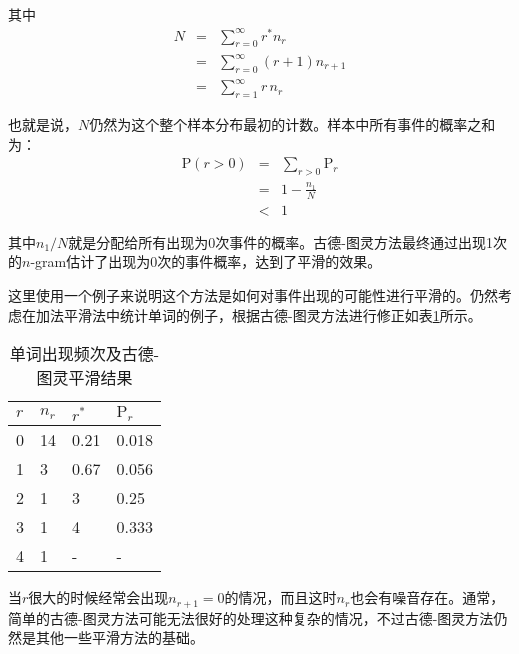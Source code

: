 \noindent 其中
\begin{eqnarray}
N & = & \sum_{r=0}^{\infty}{r^{*}n_r} \nonumber \\
  & = & \sum_{r=0}^{\infty}{(r + 1)n_{r + 1}} \nonumber \\
  & = & \sum_{r=1}^{\infty}{r\,n_r}
\label{eq:2-31}
\end{eqnarray}

也就是说，$N$仍然为这个整个样本分布最初的计数。样本中所有事件的概率之和为：
\begin{eqnarray}
\textrm{P}(r>0) & = & \sum_{r>0}{\textrm{P}_r} \nonumber \\
                & = & 1 - \frac{n_1}{N} \nonumber \\
                & < & 1
\label{eq:2-32}
\end{eqnarray}

\noindent 其中$n_1/N$就是分配给所有出现为0次事件的概率。古德-图灵方法最终通过出现1次的$n$-gram估计了出现为0次的事件概率，达到了平滑的效果。

\parinterval 这里使用一个例子来说明这个方法是如何对事件出现的可能性进行平滑的。仍然考虑在加法平滑法中统计单词的例子，根据古德-图灵方法进行修正如表\ref{tab:2-21}所示。

\begin{table}[htp]{
\begin{center}
\caption{单词出现频次及古德-图灵平滑结果}
{
\begin{tabular}{l|lll}
\rule{0pt}{10pt} $r$ & $n_r$ & $r^*$ & $\textrm{P}_r$\\ \hline
\rule{0pt}{10pt} 0 & 14 & 0.21 & 0.018 \\
\rule{0pt}{10pt} 1 & 3 & 0.67 & 0.056 \\
\rule{0pt}{10pt} 2 & 1 & 3 & 0.25 \\
\rule{0pt}{10pt} 3 & 1 & 4 & 0.333 \\
\rule{0pt}{10pt} 4 & 1 & - & - \\
\end{tabular}
\label{tab:2-21}
}
\end{center}
}\end{table}

\vspace{-1.5em}
\parinterval 当$r$很大的时候经常会出现$n_{r+1}=0$的情况，而且这时$n_r$也会有噪音存在。通常，简单的古德-图灵方法可能无法很好的处理这种复杂的情况，不过古德-图灵方法仍然是其他一些平滑方法的基础。

